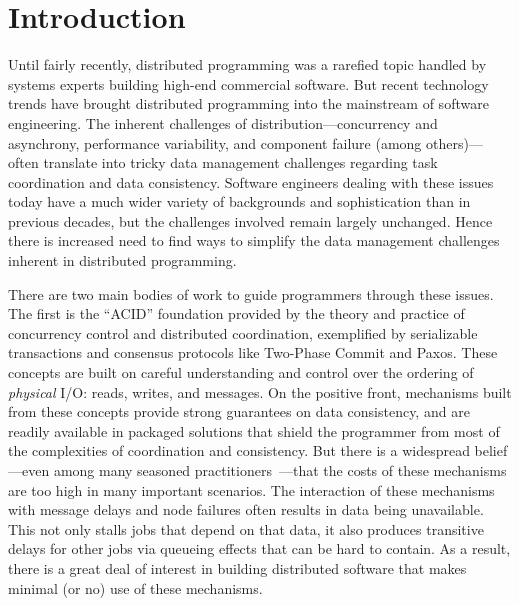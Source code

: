 \section{Introduction}

Until fairly recently, distributed programming was a rarefied topic handled by systems experts building high-end commercial software. But recent technology trends have brought distributed programming into the mainstream of software engineering.  The inherent challenges of distribution---concurrency and asynchrony, performance variability, and component failure (among others)---often translate into tricky data management challenges regarding task coordination and data consistency.  Software engineers dealing with these issues today have a much wider variety of backgrounds and sophistication than in previous decades, but the challenges involved remain largely unchanged.  Hence there is increased need to find ways to simplify the data management challenges inherent in distributed programming.

There are two main bodies of work to guide programmers through these issues.  The first is the ``ACID'' foundation provided by the theory and practice of concurrency control and distributed coordination, exemplified by serializable transactions and consensus protocols like Two-Phase Commit and Paxos.  These concepts are built on careful understanding and control over the ordering of {\em physical} I/O: reads, writes, and messages.  On the positive front, mechanisms built from these concepts provide strong guarantees on data consistency, and are readily available in packaged solutions that shield the programmer from most of the complexities of coordination and consistency.  But there is a widespread belief---even among many seasoned practitioners~\cite{ladis}---that the costs of these mechanisms are too high in many important scenarios.  The interaction of these mechanisms with message delays and node failures often results in data being unavailable. This not only stalls jobs that depend on that data, it also produces transitive delays for other jobs via queueing effects that can be hard to contain.  As a result, there is a great deal of interest in building distributed software that makes minimal (or no) use of these mechanisms.

